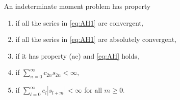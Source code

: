 \begin{defn}\label{thm:defAH} An indeterminate moment problem has property
\begin{enumerate}\itemsep=0pt
\item[{\rm (c)}] if all the series in \eqref{eq:AH1} are convergent,
\item[{\rm (ac)}] if all the series in \eqref{eq:AH1} are absolutely convergent,
\item[{\rm (aci)}] if it has property {\rm (ac)} and \eqref{eq:AH} holds,
\item[{\rm (cs)}] if $\sum\limits_{n=0}^\infty c_{2n}s_{2n}<\infty$,
\item[{\rm (cs*)}] if $\sum\limits_{l=0}^\infty c_l|s_{l+m}|<\infty$ for all $m\ge 0$.
\end{enumerate}
\end{defn}
